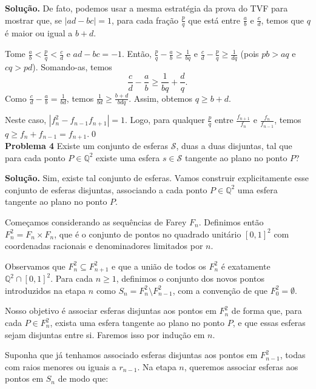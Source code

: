 \documentclass{hipatia}
\theoremstyle{definition} %
\begin{document}
\noindent \textbf{Solução.} De fato, podemos usar a mesma estratégia da prova do TVF para mostrar que, se $|ad - bc| = 1$, para cada fração $\frac{p}{q}$ que está entre $\frac{a}{b}$ e $\frac{c}{d}$, temos que $q$ é maior ou igual a $b + d$.

Tome $\frac{a}{b} < \frac{p}{q} < \frac{c}{d}$ e $ad - bc = -1$. Então, $\frac{p}{q} - \frac{a}{b} \geq \frac{1}{bq}$ e $\frac{c}{d} - \frac{p}{q} \geq \frac{1}{dq}$ (pois $pb > aq$ e $cq > pd$). Somando-as, temos
$$
\frac{c}{d} - \frac{a}{b} \geq \frac{1}{bq} + \frac{d}{q}.
$$
Como $\frac{c}{d} - \frac{a}{b} = \frac{1}{bd}$, temos $\frac{1}{bd} \geq \frac{b + d}{bdq}$. Assim, obtemos $q \geq b + d$.

Neste caso, $|f_n^2 - f_{n-1} f_{n+1}| = 1$. Logo, para qualquer $\frac{p}{q}$ entre $\frac{f_{n+1}}{f_n}$ e $\frac{f_n}{f_{n-1}}$, temos $q \geq f_n + f_{n-1} = f_{n+1}$.\qed\\

\noindent \textbf{Problema 4} 
Existe um conjunto de esferas $\mathcal{S}$, duas a duas disjuntas, tal que para cada ponto \( P \in \mathbb{Q}^2 \) existe uma esfera \( s \in \mathcal{S} \) tangente ao plano no ponto \( P \)?\vspace{0.2cm}

\noindent \textbf{Solução.} Sim, existe tal conjunto de esferas. Vamos construir explicitamente esse conjunto de esferas disjuntas, associando a cada ponto \( P \in \mathbb{Q}^2 \) uma esfera tangente ao plano no ponto \( P \).

Começamos considerando as sequências de Farey \( F_n \). Definimos então \( F_n^2 = F_n \times F_n \), que é o conjunto de pontos no quadrado unitário \([0,1]^2\) com coordenadas racionais e denominadores limitados por \( n \).

Observamos que \( F_n^2 \subseteq F_{n+1}^2 \) e que a união de todos os \( F_n^2 \) é exatamente \( \mathbb{Q}^2 \cap [0,1]^2 \). Para cada \( n \geq 1 \), definimos o conjunto dos novos pontos introduzidos na etapa \( n \) como \( S_n = F_n^2 \setminus F_{n-1}^2 \), com a convenção de que \( F_0^2 = \emptyset \).

Nosso objetivo é associar esferas disjuntas aos pontos em \( F_n^2 \) de forma que, para cada \( P \in F_n^2 \), exista uma esfera tangente ao plano no ponto \( P \), e que essas esferas sejam disjuntas entre si. Faremos isso por indução em \( n \).

Suponha que já tenhamos associado esferas disjuntas aos pontos em \( F_{n-1}^2 \), todas com raios menores ou iguais a \( r_{n-1} \). Na etapa \( n \), queremos associar esferas aos pontos em \( S_n \) de modo que:
\end{document}
